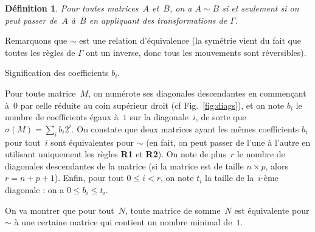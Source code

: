 \documentclass[11pt, openany, a4paper]{article}
\newtheorem*{df*}{ \textbf{Définition}}{}
\newcommand\tikzmark[1]{%
  \tikz[overlay,remember picture,baseline] 
  \node[anchor=base](#1){};}
\begin{document}
\begin{df*}
Pour toutes matrices~$A$ et~$B$, on a $A\sim B$ si et seulement si on peut passer de~$A$ à~$B$ en appliquant des transformations de $\Gamma$.
\end{df*}

Remarquons que $\sim$ est une relation d'équivalence (la symétrie vient du fait que toutes les règles de $\Gamma$ ont un inverse, donc tous les mouvements sont réversibles).



\begin{floatingfigure}[r]{.5\textwidth}
\centering


\caption{Signification des coefficients $b_i$.}
\label{fig:diags}
\end{floatingfigure}
Pour toute matrice~$M$, on numérote ses diagonales descendantes en commençant à~$0$ par celle réduite au coin supérieur droit (cf Fig.~\ref{fig:diags}), et on note $b_i$ le nombre de coefficients égaux à~$1$ sur la diagonale~$i$, de sorte que \linebreak \mbox{$\sigma (M) = \sum\limits_ib_i2^i$}. On constate que deux matrices ayant les mêmes coefficients $b_i$ pour tout~$i$ sont équivalentes pour $\sim$ (en fait, on peut passer de l'une à l'autre en utilisant uniquement les règles \textbf{R1} et \textbf{R2}). On note de plus~$r$ le nombre de diagonales descendantes de la matrice (si la matrice est de taille $n\times p$, alors $r = n+p+1$). Enfin, pour tout $0\leq i < r$, on note $t_i$ la taille de la~$i$-ème diagonale : on a $0\leq b_i \leq t_i$. 
 
On va montrer que pour tout~$N$, toute matrice de somme~$N$ est équivalente pour $\sim$ à une certaine matrice qui contient un nombre minimal de~$1$.
\end{document}
